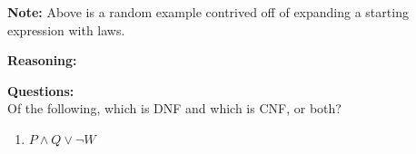\begin{Note}
    \textbf{Note:} Above is a random example contrived off of expanding a starting expression with laws.
\end{Note}

\begin{Tip}

\end{Tip}


\textbf{Reasoning:}


\noindent
\textbf{Questions:}\\
Of the following, which is DNF and which is CNF, or both?

\begin{enumerate}
    \item $P\land Q\lor \neg W$
\end{enumerate}